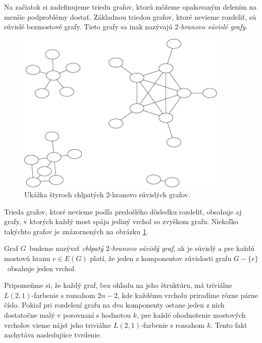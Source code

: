 Na začiatok si zadefinujeme triedu grafov, ktorú môžeme opakovaným delením na menšie
podproblémy dostať. Základnou triedou grafov, ktoré nevieme rozdeliť, sú súvislé
bezmostové grafy. Tieto grafy sa inak nazývajú \emph{$2$-hranovo súvislé grafy}.

\begin{figure}
\centerline{\includegraphics[width=0.9\textwidth]{images/ec2_example.pdf}}

\caption[Chlpaté $2$-hranovo súvislé grafy]{Ukážka štyroch
chlpatých $2$-hranovo súvislých grafov.}

\label{graf:ec2}
\end{figure}

Trieda grafov, ktoré nevieme podľa predošlého dôsledku rozdeliť, obsahuje aj grafy,
v ktorých každý most spája jediný vrchol so zvyškom grafu. Niekoľko takýchto grafov je
znázornených na obrázku \ref{graf:ec2}.

\begin{defn}
    Graf $G$ budeme nazývať \emph{chlpatý $2$-hranovo súvislý graf}, ak je súvislý a pre
    každú mostovú hranu $e \in E(G)$ platí, že jeden z komponentov súvislosti grafu
    $G - \{e\}$ obsahuje jeden vrchol.
\end{defn}

Pripomeňme si, že každý graf, bez ohľadu na jeho štruktúru, má triviálne $L(2,1)$-farbenie
s rozsahom $2n - 2$, kde každému vrcholu priradíme rôzne párne číslo. Pokiaľ pri rozdelení
grafu na dva komponenty ostane jeden z nich dostatočne malý v porovnaní s hodnotou $k$,
pre každé ohodnotenie mostových vrcholov vieme nájsť jeho triviálne $L(2,1)$-farbenie s
rozsahom $k$. Tento fakt zachytáva nasledujúce tvrdenie.

